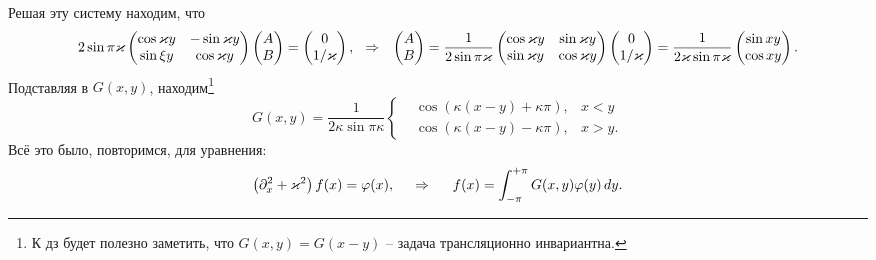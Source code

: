 Решая эту систему находим, что
\begin{equation*}
    2 \sin \pi \kappa 
    \begin{pmatrix}
        \cos \kappa y & - \sin \kappa y  \\
        \sin \xi y & \cos \kappa y  \\
    \end{pmatrix} \begin{pmatrix}
        A  \\
        B  \\
    \end{pmatrix}
    = \begin{pmatrix}
        0 \\ 1/\kappa
    \end{pmatrix},
    \hspace{0.25cm} \Rightarrow \hspace{0.25cm}
    \begin{pmatrix}
        A \\ B
    \end{pmatrix} = 
    \frac{1}{2 \sin \pi \kappa} \begin{pmatrix}
        \cos \kappa y & \sin \kappa y  \\
        \sin \kappa y & \cos \kappa y  \\
    \end{pmatrix}
    \begin{pmatrix}
        0 \\ 1/\kappa
    \end{pmatrix} = 
    \frac{1}{2 \kappa \sin \pi \kappa} \begin{pmatrix}
        \sin xy \\ \cos xy
    \end{pmatrix}.
\end{equation*}
Подставляя в $G(x, y)$, находим\footnote{
    К дз будет полезно заметить, что $G(x, y) = G(x-y)$ -- задача трансляционно инвариантна. 
} 
\begin{equation*}
    G(x, y) = \frac{1}{2 \kappa \sin \pi \kappa}
    \left\{\begin{aligned}
        &\cos \left(\kappa(x-y) + \kappa \pi\right), & x < y\\
        &\cos(\kappa (x-y) - \kappa \pi), & x > y.
    \end{aligned}\right.
\end{equation*}
Всё это было, повторимся, для уравнения:
\begin{equation*}
    \left(\partial_x^2 + \kappa^2\right) f(x) = \varphi(x),
    \hspace{0.5cm} \Rightarrow \hspace{0.5cm}   
    f(x) = 
    \int_{-\pi}^{+\pi} G(x, y) \varphi(y) \d y. 
\end{equation*}



